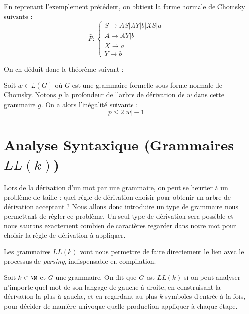 \begin{example}
    En reprenant l'exemplement précédent, on obtient la forme normale de Chomsky suivante : 
    \[ \overset{\sim}{P} : 
        \begin{cases}
            S \longrightarrow AS | AY | b | XS | a \\ 
            A \longrightarrow AY | b \\ 
            X \longrightarrow a \\ 
            Y \longrightarrow b 
        \end{cases} \] 
\end{example}

On en déduit donc le théorème suivant :

\begin{theorem}
    Soit $w \in L(G)$ où $G$ est une grammaire formelle sous forme normale de Chomsky. 
    Notons $p$ la profondeur de l'arbre de dérivation de $w$ dans cette grammaire $g$. 
    On a alors l'inégalité suivante : 
        \[ \boxed{p \leqslant 2 |w| -1 } \] 
\end{theorem}


\section{Analyse Syntaxique (Grammaires $LL(k)$)}

Lors de la dérivation d'un mot par une grammaire, on peut se heurter à un problème de taille : quel règle de dérivation choisir 
pour obtenir un arbre de dérivation acceptant ? 
Nous allons donc introduire un type de grammaire nous permettant de régler ce problème. Un seul type de dérivation 
sera possible et nous saurons exactement combien de caractères regarder dans notre mot pour choisir la règle 
de dérivation à appliquer. 

Les grammaires $LL(k)$ vont nous permettre de faire directement le lien avec le processus de \emph{parsing}, indispensable 
en compilation. 

\begin{definition}[Grammaire $LL(k)$]
    Soit $k \in \N$ et $G$ une grammaire. On dit que $G$ est $LL(k)$ si on peut analyser n’importe quel mot 
    de son langage de gauche à droite, en construisant la dérivation la plus à gauche, et en regardant au plus $k$ 
    symboles d’entrée à la fois, pour décider de manière univoque quelle production appliquer à chaque étape.
\end{definition}

